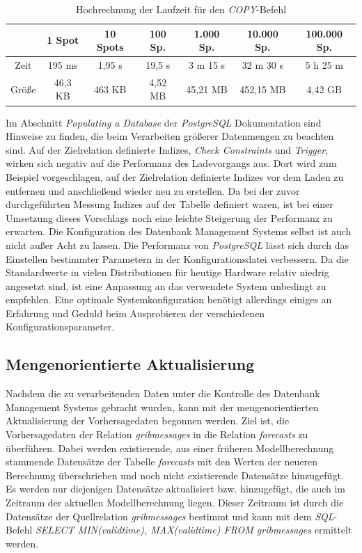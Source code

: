 \begin{table}[h]
  \centering
  {\sf
    \footnotesize
    \begin{longtable}{c|c|c|c|c|c|c}

      \toprule
      \textbf & \textbf{1 Spot} & \textbf{10 Spots} & \textbf{100 Sp.} & \textbf{1.000 Sp.} & \textbf{10.000 Sp.} & \textbf{100.000 Sp.} \\
      \midrule
      Zeit & 195 ms & 1,95 s & 19,5 s & 3 m 15 s & 32 m 30 s & 5 h 25 m \\
      Größe & 46,3 KB & 463 KB & 4,52 MB & 45,21 MB & 452,15 MB & 4,42 GB \\
      \bottomrule
    \end{longtable}
  }
  \caption{Hochrechnung der Laufzeit für den \textit{COPY}-Befehl}
  \label{tab:transformation_bulk_load}
\end{table}

Im Abschnitt \textit{Populating a Database} \cite{postgresql:populate}
der \textit{PostgreSQL} Dokumentation sind Hinweise zu finden, die
beim Verarbeiten größerer Datenmengen zu beachten sind. Auf der
Zielrelation definierte Indizes, \textit{Check Constraints} und
\textit{Trigger}, wirken sich negativ auf die Performanz des
Ladevorgangs aus. Dort wird zum Beispiel vorgeschlagen, auf der
Zielrelation definierte Indizes vor dem Laden zu entfernen und
anschließend wieder neu zu erstellen. Da bei der zuvor durchgeführten
Messung Indizes auf der Tabelle definiert waren, ist bei einer
Umsetzung dieses Vorschlags noch eine leichte Steigerung der
Performanz zu erwarten. Die Konfiguration des Datenbank Management
Systems selbst ist auch nicht außer Acht zu lassen. Die Performanz von
\textit{PostgreSQL} lässt sich durch das Einstellen bestimmter
Parametern in der Konfigurationsdatei verbessern. Da die Standardwerte
in vielen Distributionen für heutige Hardware relativ niedrig
angesetzt sind, ist eine Anpassung an das verwendete System unbedingt
zu empfehlen. Eine optimale Systemkonfiguration benötigt allerdings
einiges an Erfahrung und Geduld beim Ausprobieren der verschiedenen
Konfigurationsparameter.

\subsection{Mengenorientierte Aktualisierung}
Nachdem die zu verarbeitenden Daten unter die Kontrolle des Datenbank
Management Systems gebracht wurden, kann mit der mengenorientierten
Aktualisierung der Vorhersagedaten begonnen werden. Ziel ist, die
Vorhersagedaten der Relation \textit{grib\textunderscore messages} in
die Relation \textit{forecasts} zu überführen. Dabei werden
existierende, aus einer früheren Modellberechnung stammende Datensätze
der Tabelle \textit{forecasts} mit den Werten der neueren Berechnung
überschrieben und noch nicht existierende Datensätze hinzugefügt. Es
werden nur diejenigen Datensätze aktualisiert bzw.  hinzugefügt, die
auch im Zeitraum der aktuellen Modellberechnung liegen. Dieser
Zeitraum ist durch die Datensätze der Quellrelation
\textit{grib\textunderscore messages} bestimmt und kann mit dem
\textit{SQL}-Befehl \textit{SELECT MIN(valid\textunderscore time),
  MAX(valid\textunderscore time) FROM grib\textunderscore messages}
ermittelt werden.

